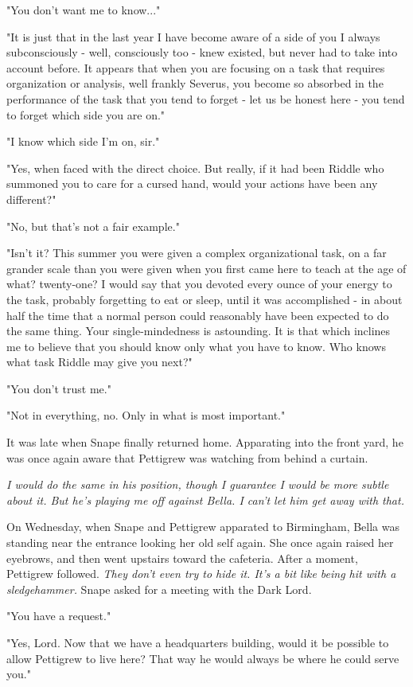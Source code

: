 \documentclass[a4paper,11pt]{article}
\begin{document}
"You don't want me to know..."

"It is just that in the last year I have become aware of a side of you I always subconsciously - well, consciously too - knew existed, but never had to take into account before. It appears that when you are focusing on a task that requires organization or analysis, well frankly Severus, you become so absorbed in the performance of the task that you tend to forget - let us be honest here - you tend to forget which side you are on."

"I know which side I'm on, sir."

"Yes, when faced with the direct choice. But really, if it had been Riddle who summoned you to care for a cursed hand, would your actions have been any different?"

"No, but that's not a fair example."

"Isn't it? This summer you were given a complex organizational task, on a far grander scale than you were given when you first came here to teach at the age of what? twenty-one? I would say that you devoted every ounce of your energy to the task, probably forgetting to eat or sleep, until it was accomplished - in about half the time that a normal person could reasonably have been expected to do the same thing. Your single-mindedness is astounding. It is that which inclines me to believe that you should know only what you have to know. Who knows what task Riddle may give you next?"

"You don't trust me."

"Not in everything, no. Only in what is most important."

It was late when Snape finally returned home. Apparating into the front yard, he was once again aware that Pettigrew was watching from behind a curtain.

\emph{I would do the same in his position, though I guarantee I would be more subtle about it. But he's playing me off against Bella. I can't let him get away with that.}

On Wednesday, when Snape and Pettigrew apparated to Birmingham, Bella was standing near the entrance looking her old self again. She once again raised her eyebrows, and then went upstairs toward the cafeteria. After a moment, Pettigrew followed. \emph{They don't even try to hide it. It's a bit like being hit with a sledgehammer.} Snape asked for a meeting with the Dark Lord.

"You have a request."

"Yes, Lord. Now that we have a headquarters building, would it be possible to allow Pettigrew to live here? That way he would always be where he could serve you."
\end{document}
